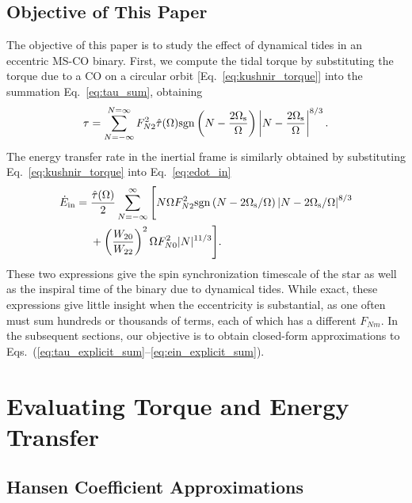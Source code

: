 \documentclass[
        fleqn,
        usenatbib,
    ]{mnras}
\begin{document}
\subsection{Objective of This Paper}\label{ss:objective}

The objective of this paper is to study the effect of dynamical tides in an
eccentric MS-CO binary. First, we compute the tidal torque by substituting the
torque due to a CO on a circular orbit [Eq.~\eqref{eq:kushnir_torque}] into the
summation Eq.~\eqref{eq:tau_sum}, obtaining
\begin{equation}
    \tau = \sum_{N = -\infty}^{N = \infty} F_{N2}^2 \hat{\tau}(\Omega)
        \mathrm{sgn}\left(N - \frac{2\Omega_{\rm s}}{ \Omega}\right) \left|N - \frac{2
        \Omega_{\rm s}}{\Omega}\right|^{8/3}.\label{eq:tau_explicit_sum}
\end{equation}
The energy transfer rate in the inertial frame is similarly obtained by
substituting Eq.~\eqref{eq:kushnir_torque} into Eq.~\eqref{eq:edot_in}
\begin{align}
    \dot{E}_{\rm in} ={}& \frac{\hat{\tau}(\Omega)}{2}
        \sum_{N = -\infty}^{\infty} \Bigg[
            N\Omega F_{N2}^2 \mathrm{sgn}\left(N - 2\Omega_{\rm s} / \Omega\right)
                    \left|N - 2 \Omega_{\rm s} / \Omega\right|^{8/3}\nonumber\\
            &+ \left(\frac{W_{20}}{W_{22}}\right)^2 \Omega
                    F_{N0}^2 |N|^{11/3}
            \Bigg].\label{eq:ein_explicit_sum}
\end{align}
These two expressions give the spin synchronization timescale of the star as
well as the inspiral time of the binary due to dynamical tides. While exact,
these expressions give little insight when the eccentricity is substantial, as
one often must sum hundreds or thousands of terms, each of which has a different
$F_{Nm}$. In the subsequent sections, our objective is to obtain closed-form
approximations to Eqs.~(\ref{eq:tau_explicit_sum}--\ref{eq:ein_explicit_sum}).

\section{Evaluating Torque and Energy Transfer}\label{s:approx}

\subsection{Hansen Coefficient Approximations}\label{s:hansens}
\end{document}
